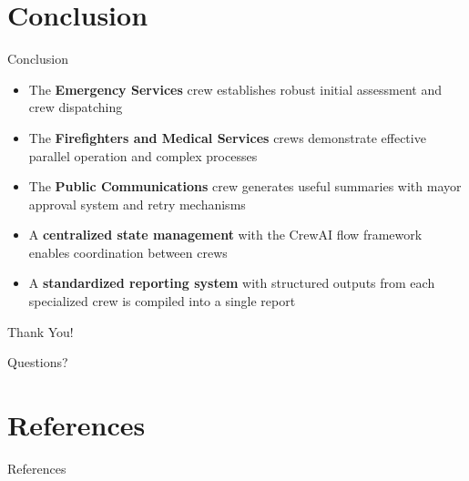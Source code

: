 \documentclass{beamer}
\begin{document}
\section{Conclusion}
\begin{frame}{Conclusion}
    \begin{itemize}
        \item The \textbf{Emergency Services} crew establishes robust initial assessment and crew dispatching
        \item The \textbf{Firefighters and Medical Services} crews demonstrate effective parallel operation and complex processes
        \item The \textbf{Public Communications} crew generates useful summaries with mayor approval system and retry mechanisms
        \item A \textbf{centralized state management} with the CrewAI flow framework enables coordination between crews
        \item A \textbf{standardized reporting system} with structured outputs from each specialized crew is compiled into a single report
    \end{itemize}
\end{frame}

\begin{frame}
    \centering
    \vspace{2cm}
    {\Large Thank You!}
    \vspace{1cm}
    
    {\large Questions?}
\end{frame}


\section{References}
\begin{frame}{References}
    \nocite{*}
    
\end{frame}
\end{document}
